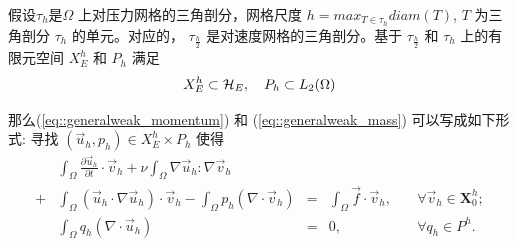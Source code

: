        假设$\tau_h$是$\Omega$ 上对压力网格的三角剖分，网格尺度 $h = max_{T
         \in \tau_h} diam(T)$, $T$ 为三角剖分 $\tau_h$ 的单元。对应的，
       $\tau_{\frac{h}{2}}$ 是对速度网格的三角剖分。基于
       $\tau_{\frac{h}{2}}$ 和 $\tau_{h}$ 上的有限元空间 $X_E^h$ 和 $P_h$
       满足
       \begin{equation}
         X_E^h \subset \mathcal{H}_E, \quad P_h \subset L_2(\Omega)
         \notag
       \end{equation}

       那么(\ref{eq::generalweak_momentum}) 和 (\ref{eq::generalweak_mass})
       可以写成如下形式: 寻找 $(\vec{u}_h, p_h) \in X_E^h \times P_h$ 使得
       \begin{equation}
         \begin{aligned}
           &\int_{\Omega}\frac{\partial \vec{u}_h}{\partial t} \cdot \vec{v}_h
           + \nu \int_\Omega \nabla \vec{u}_h : \nabla \vec{v}_h  \\
           + & \int_\Omega \left( \vec{u}_h \cdot \nabla \vec{u}_h \right)
           \cdot \vec{v}_h - \int_\Omega p_h \left( \nabla \cdot \vec{v}_h
           \right) & = &\int_\Omega \vec{f} \cdot \vec{v}_h, &\quad
           \forall \vec{v}_h \in \mathbf{X}_0^h;  \\
           & \int_\Omega q_h \left( \nabla \cdot \vec{u}_h \right) & = &0,&
           \quad \forall q_h \in P^h.
           \label{eq::discreted_weak}
         \end{aligned}
       \end{equation}

